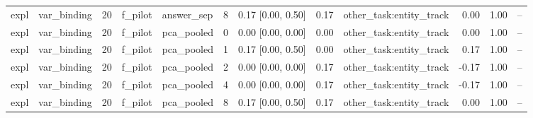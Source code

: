\begin{tabular}{llrllrrrlrrr}
expl & var\_binding & 20 & f\_pilot & answer\_sep & 8 & 0.17 [0.00, 0.50] & 0.17 & other\_task:entity\_track & 0.00 & 1.00 & -- \\
expl & var\_binding & 20 & f\_pilot & pca\_pooled & 0 & 0.00 [0.00, 0.00] & 0.00 & other\_task:entity\_track & 0.00 & 1.00 & -- \\
expl & var\_binding & 20 & f\_pilot & pca\_pooled & 1 & 0.17 [0.00, 0.50] & 0.00 & other\_task:entity\_track & 0.17 & 1.00 & -- \\
expl & var\_binding & 20 & f\_pilot & pca\_pooled & 2 & 0.00 [0.00, 0.00] & 0.17 & other\_task:entity\_track & -0.17 & 1.00 & -- \\
expl & var\_binding & 20 & f\_pilot & pca\_pooled & 4 & 0.00 [0.00, 0.00] & 0.17 & other\_task:entity\_track & -0.17 & 1.00 & -- \\
expl & var\_binding & 20 & f\_pilot & pca\_pooled & 8 & 0.17 [0.00, 0.50] & 0.17 & other\_task:entity\_track & 0.00 & 1.00 & -- \\
\bottomrule
\end{tabular}
